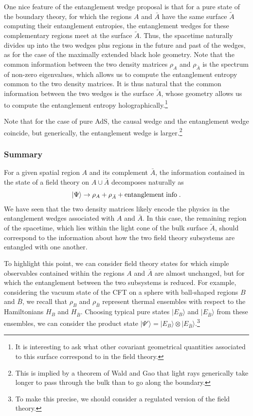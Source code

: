 \documentclass[12pt,epsf]{article}
\newcommand{\be}{\begin{equation}}
\newcommand{\ee}{\end{equation}}
\begin{document}
One nice feature of the entanglement wedge proposal is that for a pure state of the boundary theory, for which the regions $A$ and $\bar{A}$ have the same surface $\tilde{A}$ computing their entanglement entropies, the entanglement wedges for these complementary regions meet at the surface $\tilde{A}$. Thus, the spacetime naturally divides up into the two wedges plus regions in the future and past of the wedges, as for the case of the maximally extended black hole geometry. Note that the common information between the two density matrices $\rho_A$ and $\rho_{\bar{A}}$ is the spectrum of non-zero eigenvalues, which allows us to compute the entanglement entropy common to the two density matrices. It is thus natural that the common information between the two wedges is the surface $\tilde{A}$, whose geometry allows us to compute the entanglement entropy holographically.\footnote{It is interesting to ask what other covariant geometrical quantities associated to this surface correspond to in the field theory.}

Note that for the case of pure AdS, the causal wedge and the entanglement wedge coincide, but generically, the entanglement wedge is larger.\footnote{This is implied by a theorem of Wald and Gao that light rays generically take longer to pass through the bulk than to go along the boundary.}

\subsubsection*{Summary}

For a given spatial region $A$ and its complement $\bar{A}$, the information contained in the state of a field theory on $A \cup \bar{A}$ decomposes naturally as
\be
|\Psi \rangle \to \rho_A + \rho_{\bar{A}} + {\rm entanglement \; info} \; .
\ee
We have seen that the two density matrices likely encode the physics in the entanglement wedges associated with $A$ and $\bar{A}$. In this case, the remaining region of the spacetime, which lies within the light cone of the bulk surface $\tilde{A}$, should correspond to the information about how the two field theory subsystems are entangled with one another.

To highlight this point, we can consider field theory states for which simple observables contained within the regions $A$ and $\bar{A}$ are almost unchanged, but for which the entanglement between the two subsystems is reduced. For example, considering the vacuum state of the CFT on a sphere with ball-shaped regions $B$ and $\bar{B}$, we recall that $\rho_B$ and $\rho_{\bar{B}}$ represent thermal ensembles with respect to the Hamiltonians $H_B$ and $H_{\bar{B}}$. Choosing typical pure states $|E_B \rangle$ and $|E_{\bar{B}} \rangle$ from these ensembles, we can consider the product state $|\Psi' \rangle = |E_B \rangle \otimes |E_{\bar{B}} \rangle$.\footnote{To make this precise, we should consider a regulated version of the field theory.}
\end{document}
